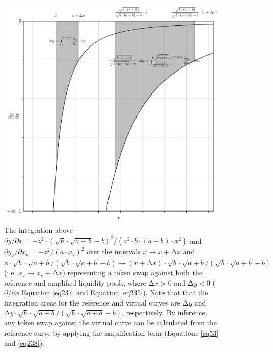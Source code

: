 \documentclass{article}
\begin{document}
\begin{figure}[ht]
    \centering
    \includegraphics[width=\textwidth]{fig49.png}
    \captionsetup{
        justification=raggedright,
        singlelinecheck=false,
        font=small,
        labelfont=bf,
        labelsep=quad,
        format=plain
    }
    \caption{The integration above $\partial y / \partial x = - z^{2} \cdot \left( \sqrt{b} \cdot \sqrt{a + b} - b \right)^{2} / \left( a^{2} \cdot b \cdot \left( a + b \right) \cdot x^{2} \right)$ and $\partial y_{\text{v}} / \partial x_{\text{v}} = - z^{2} / \left( a \cdot x_{\text{v}} \right)^{2}$ over the intervals $x \rightarrow x + \mathrm{\Delta}x$ and $x \cdot \sqrt{b} \cdot \sqrt{a + b} / \left( \sqrt{b} \cdot \sqrt{a + b}  - b\right) \rightarrow \left(x + \mathrm{\Delta}x \right) \cdot \sqrt{b} \cdot \sqrt{a + b} / \left( \sqrt{b} \cdot \sqrt{a + b}  - b\right)$ (i.e. $x_{\text{v}} \rightarrow x_{\text{v}} + \mathrm{\Delta}x$) representing a token swap against both the reference and amplified liquidity pools, where $\mathrm{\Delta}x > 0$ and $\mathrm{\Delta}y < 0$ ($\partial / \partial x$ Equation \ref{eq237} and Equation \ref{eq235}). Note that that the integration areas for the reference and virtual curves are $\mathrm{\Delta}y$ and $\mathrm{\Delta}y \cdot \sqrt{b} \cdot \sqrt{a + b} / \left( \sqrt{b} \cdot \sqrt{a + b} - b \right)$, respectively. By inference, any token swap against the virtual curve can be calculated from the reference curve by applying the amplification term (Equations \ref{eq53} and \ref{eq238}).}
    \label{fig49}
\end{figure}
\end{document}
